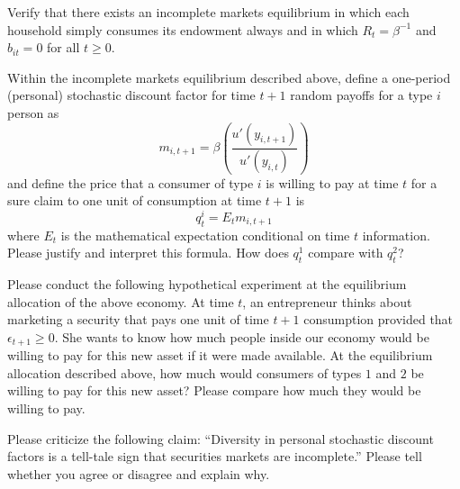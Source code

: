 \medskip
{}  Verify that there exists an incomplete markets  equilibrium in which each household simply consumes its endowment always and in which $R_t = \beta^{-1}$  and $b_{it} = 0$ for all $t \geq 0$.

\medskip
{} Within the incomplete markets equilibrium described above, define a one-period (personal) stochastic discount factor  for time $t+1$ random payoffs for a type $i$ person as
$$ m_{i,t+1} = \beta \left( {\frac{u'(y_{i,t+1})}{u'(y_{i,t})}} \right)  $$
and define the price that a consumer of type $i$ is willing to pay at time $t$ for a sure claim to one unit of  consumption at time $t+1$ is
$$ q^i_t = E_t m_{i,t+1} $$
where $E_t$ is the mathematical expectation conditional on time $t$ information. Please justify and interpret this formula. How does $q^1_t$ compare  with
$q^2_t$?

\medskip
{} Please conduct the following hypothetical experiment at the equilibrium allocation of the above economy.  At time
$t$, an entrepreneur thinks about marketing a security that pays one unit of time  $t+1$ consumption
provided that $\epsilon_{t+1} \geq 0$.  She wants to know how much people inside our economy would be willing to pay for this new asset if it were made available.  At the equilibrium allocation described above,
how much would consumers of types $1$ and $2$ be willing to pay for this new  asset?
Please compare how much they would be willing to pay.

\medskip
{} Please criticize the following claim: ``Diversity in personal stochastic discount factors is a tell-tale sign
that securities markets are incomplete.''  Please tell whether you agree or disagree and explain why.

